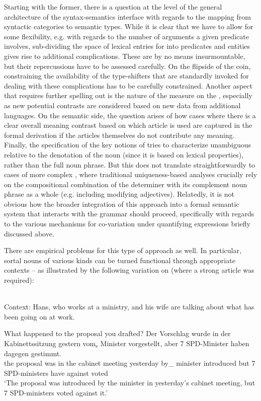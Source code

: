 \documentclass[output=paper
,modfonts
,nonflat]{langscibook}
\begin{document}
Starting with the former, there is a question at the level of the
general architecture of the syntax-semantics interface with regards to
the mapping from syntactic categories to semantic types. While it is
clear that we have to allow for some flexibility, e.g. with regards
to the number of arguments a given predicate involves, sub-dividing
the space of lexical entries for  into predicates and entities
gives rise to additional complications. These are by no means
insurmountable, but their repercussions have to be assessed carefully.
On the flipside of the coin, constraining the availability of the
type-shifters that are standardly invoked for dealing with these
complications has to be carefully constrained. Another aspect that
requires further spelling out is the
nature of the measure on the , especially as new
potential contrasts are considered based on new data from additional
languages. On the semantic side, the question arises of how cases where there is a
clear overall meaning contrast based on which article is used are
captured in the formal derivation if the articles themselves do not
contribute any meaning. Finally, the specification of the key notions
of  tries to characterize unambiguous  relative to
the denotation of the noun (since it is based on lexical properties),
rather than the full noun phrase. But this does not translate straightforwardly to
cases of more complex , where traditional uniqueness-based
analyses crucially rely on the compositional combination of the
determiner with its complement noun phrase as a whole (e.g. including
modifying adjectives). Relatedly, it is
not obvious how the broader integration of this approach into a formal
semantic system that interacts with the grammar should proceed,
specifically with regards to the various mechanisms for co-variation
under quantifying expressions briefly discussed above. 

There are empirical problems for this type of approach as well. In particular,
sortal nouns of various kinds can be turned functional through
appropriate contexts -- as illustrated by the following variation on
 (where a strong article
was required):

\begin{exe}
\ex {} \\ Context: Hans, who works at a ministry, and his wife are talking about what has been going on at work.
\begin{xlist}
\ex What happened to the proposal you drafted?\newpage
\ex\gll Der Vorschlag wurde in der Kabinettssitzung gestern {vom$_\text{s}$} {Minister} vorgestellt, aber {7} {SPD-Minister} haben dagegen gestimmt.\label{minister1}\\
the proposal was in the {cabinet meeting} yesterday {by\_\theweak} minister introduced but 7 SPD-ministers have against voted\\
\glt `The proposal was introduced by the minister in yesterday's cabinet meeting, but 7 SPD-ministers voted against it.'
\end{xlist}
\end{exe}
\end{document}
